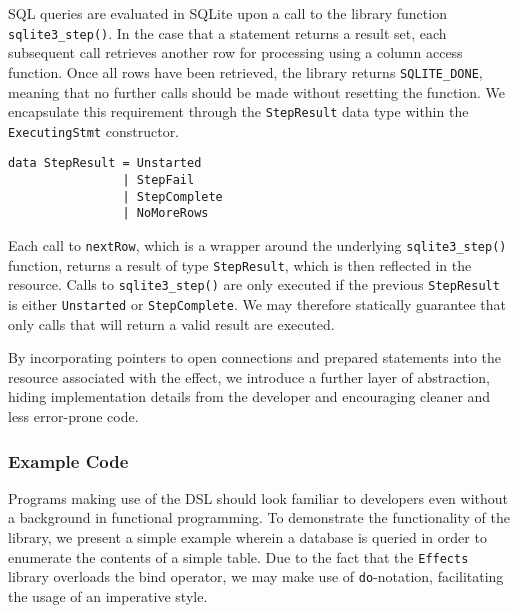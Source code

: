 \documentclass[preprint]{sigplanconf}
\begin{document}
SQL queries are evaluated in SQLite upon a call to the library function \texttt{sqlite3\_step()}. In the case that a statement returns a result set, each subsequent call retrieves another row for processing using a column access function. Once all rows have been retrieved, the library returns \texttt{SQLITE\_DONE}, meaning that no further calls should be made without resetting the function. We encapsulate this requirement through the \texttt{StepResult} data type within the \texttt{ExecutingStmt} constructor. 
{\small
\begin{verbatim}
data StepResult = Unstarted
                | StepFail
                | StepComplete
                | NoMoreRows
\end{verbatim}
}
Each call to \texttt{nextRow}, which is a wrapper around the underlying \texttt{sqlite3\_step()} function, returns a result of type \texttt{StepResult}, which is then reflected in the resource. Calls to \texttt{sqlite3\_step()} are only executed if the previous \texttt{StepResult} is either \texttt{Unstarted} or \texttt{StepComplete}. We may therefore statically guarantee that only calls that will return a valid result are executed. 

By incorporating pointers to open connections and prepared statements into the resource associated with the effect, we introduce a further layer of abstraction, hiding implementation details from the developer and encouraging cleaner and less error-prone code. 

\subsubsection{Example Code}
Programs making use of the DSL should look familiar to developers even without a background in functional programming. To demonstrate the functionality of the library, we present a simple example wherein a database is queried in order to enumerate the contents of a simple table. Due to the fact that the \texttt{Effects} library overloads the bind operator, we may make use of \texttt{do}-notation, facilitating the usage of an imperative style.
\end{document}
